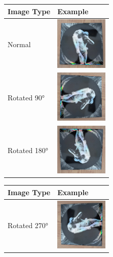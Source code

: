\begin{table} [H]
    \centering
    \renewcommand{\arraystretch}{1.5} %
    \setlength{\tabcolsep}{10pt}      %

    \begin{subtable}{0.48\textwidth}
        \centering
        \begin{tabular}{|m{2.5cm}|m{2.5cm}|}
            \hline
            \textbf{Image Type} & \textbf{Example} \\
            \hline
            Normal & \includegraphics[width=2.5cm]{figures/test_albums/Reflektor.jpg} \\
            \hline
            Rotated 90° & \includegraphics[width=2.5cm]{figures/test_albums/Reflektor_Rotated - 90.jpg} \\
            \hline
            Rotated 180° & \includegraphics[width=2.5cm]{figures/test_albums/Reflektor_Rotated - 180.jpg} \\
            \hline
        \end{tabular}
    \end{subtable}
    \hfill
    \begin{subtable}{0.48\textwidth}
        \centering
        \begin{tabular}{|m{2.5cm}|m{2.5cm}|}
            \hline
            \textbf{Image Type} & \textbf{Example} \\
            \hline
            Rotated 270° & \includegraphics[width=2.5cm]{figures/test_albums/Reflektor_Rotated - 270.jpg} \\

\end{tabular}
\end{subtable}
\end{table}

